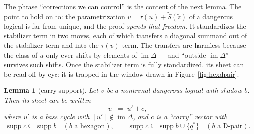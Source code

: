 \documentclass[11pt]{article}
\theoremstyle{plain}
\newtheorem{lemma}[theorem]{Lemma}
\theoremstyle{definition}
\theoremstyle{remark}
\newcommand{\suppop}{\operatorname{supp}}
\newcommand{\imD}{\operatorname{im}\Delta}
\begin{document}
The phrase ``corrections we can control'' is the content of the next
lemma. The point to hold on to: the parametrization
$v = \tau(u) + \widetilde S(\widetilde z)$ of a dangerous logical is far
from unique, and the proof \emph{spends that freedom}. It standardizes the
stabilizer term in two moves, each of which transfers a diagonal summand
out of the stabilizer term and into the $\tau(u)$ term. The transfers are
harmless because the class of $u$ only ever shifts by elements of $\imD$
--- and ``outside $\imD$'' survives such shifts. Once the stabilizer term
is fully standardized, its sheet can be read off by eye: it is trapped in
the window drawn in Figure~\ref{fig:hexdpair}.

\begin{lemma}[carry support]\label{lem:carrysupport}
Let $v$ be a nontrivial dangerous logical with shadow $b$. Then its sheet can
be written
\[
v_0 \;=\; u' + c,
\]
where $u'$ is a base cycle with $[u'] \notin \imD$, and $c$ is a ``carry''
vector with
\[
\suppop c \subseteq \suppop b \quad (b \text{ a hexagon}), \qquad
\suppop c \subseteq \suppop b \cup \{q^*\} \quad (b \text{ a D-pair}).
\]
\end{lemma}
\end{document}
